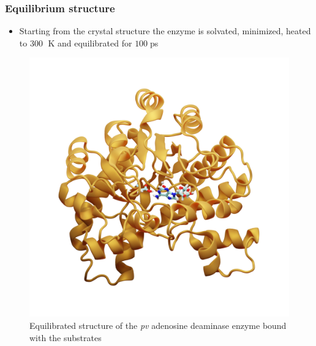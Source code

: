 \documentclass{beamer}
\begin{document}
\begin{frame}
\frametitle{Equilibrium structure}
\begin{itemize}
\item Starting from the crystal structure the enzyme is solvated, minimized, heated to $300\;$ K and
equilibrated for $100\;$ps
\end{itemize}
\begin{figure}
\includegraphics[scale=0.12]{figures/ada-equil.png}
\caption{Equilibrated structure of the \emph{pv} adenosine deaminase enzyme bound with the substrates}
\end{figure}
\end{frame}
\end{document}

